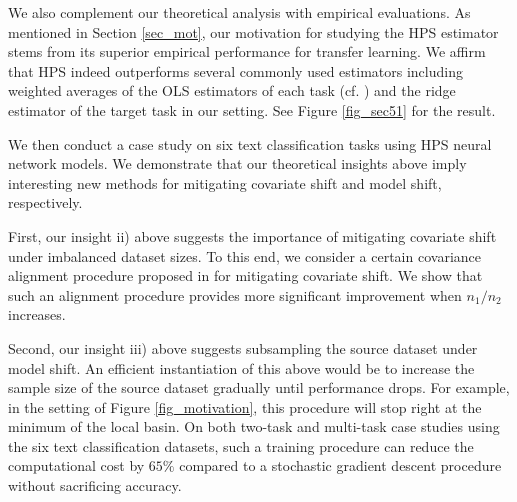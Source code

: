 We also complement our theoretical analysis with empirical evaluations.
As mentioned in Section \ref{sec_mot}, our motivation for studying the HPS estimator stems from its superior empirical performance for transfer learning.
We affirm that HPS indeed outperforms several commonly used estimators including weighted averages of the OLS estimators of each task (cf. \citet{bastani2020predicting}) and the ridge estimator of the target task in our setting. See Figure \ref{fig_sec51} for the result.

We then conduct a case study on six text classification tasks using HPS neural network models.
We demonstrate that our theoretical insights above imply interesting new methods for mitigating covariate shift and model shift, respectively.

First, our insight ii) above suggests the importance of mitigating covariate shift under imbalanced dataset sizes.
To this end, we consider a certain covariance alignment procedure proposed in \citet{WZR20} for mitigating covariate shift.
We show that such an alignment procedure provides more significant improvement when $n_1 / n_2$ increases.

Second, our insight iii) above suggests subsampling the source dataset under model shift.
An efficient instantiation of this above would be to increase the sample size of the source dataset gradually until performance drops.
For example, in the setting of Figure \ref{fig_motivation}, this procedure will stop right at the minimum of the local basin.
On both two-task and multi-task case studies using the six text classification datasets, such a training procedure can reduce the computational cost by $65\%$ compared to a stochastic gradient descent procedure without sacrificing accuracy.




